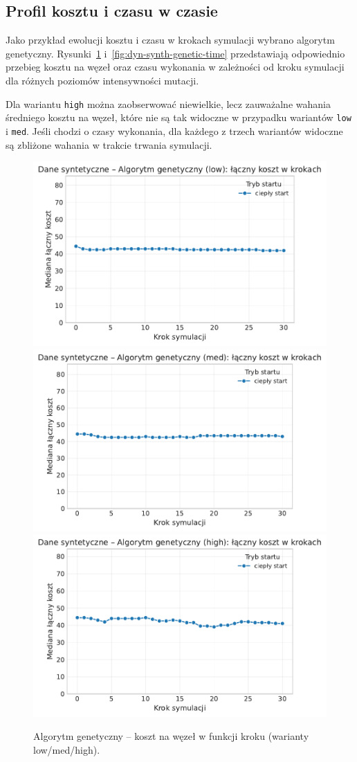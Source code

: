\subsection{Profil kosztu i czasu w czasie}
Jako przykład ewolucji kosztu i czasu w krokach symulacji wybrano algorytm genetyczny. Rysunki~\ref{fig:dyn-synth-genetic-cost} i~\ref{fig:dyn-synth-genetic-time} przedstawiają odpowiednio przebieg kosztu na węzeł oraz czasu wykonania w zależności od kroku symulacji dla różnych poziomów intensywności mutacji.

Dla wariantu \texttt{high} można zaobserwować niewielkie, lecz zauważalne wahania średniego kosztu na węzeł, które nie są tak widoczne w przypadku wariantów \texttt{low} i \texttt{med}. Jeśli chodzi o czasy wykonania, dla każdego z trzech wariantów widoczne są zbliżone wahania w trakcie trwania symulacji.

\begin{figure}[H]
  \centering
  \includegraphics[width=0.32\linewidth]{assets/figures/dynamic/synthetic/synthetic_algorytm_genetyczny_cost_over_steps_low.pdf}
  \includegraphics[width=0.32\linewidth]{assets/figures/dynamic/synthetic/synthetic_algorytm_genetyczny_cost_over_steps_med.pdf}
  \includegraphics[width=0.32\linewidth]{assets/figures/dynamic/synthetic/synthetic_algorytm_genetyczny_cost_over_steps_high.pdf}
  \caption{Algorytm genetyczny -- koszt na węzeł w funkcji kroku (warianty low/med/high).}
  \label{fig:dyn-synth-genetic-cost}
\end{figure}

